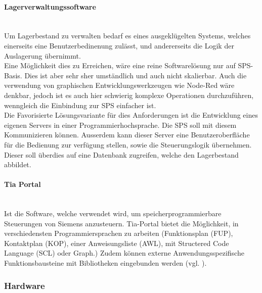 \paragraph{Lagerverwaltungssoftware}\mbox{}\\
Um Lagerbestand zu verwalten bedarf es eines ausgeklügelten Systems, welches einerseits eine Benutzerbedinenung zulässt, und andererseits die Logik der Auslagerung übernimmt. \\
Eine Möglichkeit dies zu Erreichen, wäre eine reine Softwarelösung nur auf SPS-Basis. Dies ist aber sehr sher umständlich und auch nicht skalierbar. Auch die verwendung von graphischen Entwicklungswerkzeugen wie Node-Red wäre denkbar, jedoch ist es auch hier schwierig komplexe Operationen durchzuführen, wenngleich die Einbindung zur SPS einfacher ist.\\
Die Favorisierte Lösungsvariante für dies Anforderungen ist die Entwicklung eines eigenen Servers in einer Programmierhochsprache. Die SPS soll mit diesem Kommunizieren können. Ausserdem kann dieser Server eine Benutzeroberfläche für die Bedienung zur verfügung stellen, sowie die Steuerungslogik übernehmen. Dieser soll überdies auf eine Datenbank zugreifen, welche den Lagerbestand abbildet.


\paragraph{Tia Portal}\mbox{}\\
Ist die Software, welche verwendet wird, um speicherprogrammierbare Steuerungen von Siemens anzusteuern. Tia-Portal bietet die Möglichkeit, in verschiedensten Programmiersprachen zu arbeiten (Funktionsplan (FUP), Kontaktplan (KOP), einer Anweisungsliste (AWL), mit Structered Code Language (SCL) oder Graph.) Zudem können externe Anwendungsspezifische Funktionsbausteine mit Bibliotheken eingebunden werden (vgl.
\cite{TIA_Portal_Programmiersprachen}).

\subsubsection{Hardware}
\nopagebreak
